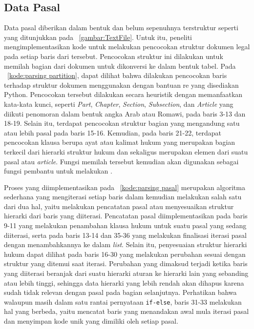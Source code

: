 \subsection{Data Pasal}
\label{subbab:4:Data Pasal}
Data pasal diberikan dalam bentuk \txt{} \file{} dan belum sepenuhnya terstruktur seperti yang ditunjukkan pada \gambar{}~\ref{gambar:TextFile}. Untuk itu, peneliti mengimplementasikan kode untuk melakukan pencocokan struktur dokumen legal pada setiap baris dari \file{} tersebut. Pencocokan struktur ini dilakukan untuk memilah bagian dari dokumen untuk dikonversi ke dalam bentuk tabel. Pada \kode{}~\ref{kode:parsing partition}, dapat dilihat bahwa dilakukan pencocokan baris terhadap struktur dokumen menggunakan \regex{} dengan bantuan \library{} re yang disediakan Python. Pencocokan tersebut dilakukan secara heuristik dengan memanfaatkan kata-kata kunci, seperti \textit{Part}, \textit{Chapter}, \textit{Section}, \textit{Subsection}, dan \textit{Article} yang diikuti penomoran dalam bentuk angka Arab atau Romawi, pada baris 3-13 dan 18-19. Selain itu, terdapat pencocokan struktur bagian yang mengandung satu atau lebih pasal pada baris 15-16. Kemudian, pada baris 21-22, terdapat pencocokan klausa berupa ayat atau kalimat hukum yang merupakan bagian terkecil dari hierarki struktur hukum dan sekaligus merupakan elemen dari suatu pasal atau \textit{article}. Fungsi memilah tersebut kemudian akan digunakan sebagai fungsi pembantu untuk melakukan \parsing{}.


Proses \parsing{} yang diimplementasikan pada \kode{}~\ref{kode:parsing pasal} merupakan algoritma sederhana yang mengiterasi setiap baris dalam \file{} kemudian melakukan salah satu dari dua hal, yaitu melakukan pencatatan pasal atau menyesuaikan struktur hierarki dari baris yang diiterasi. Pencatatan pasal diimplementasikan pada baris 9-11 yang melakukan penambahan klausa hukum untuk suatu pasal yang sedang diiterasi, serta pada baris 13-14 dan 35-36 yang melakukan finalisasi iterasi pasal dengan menambahkannya ke dalam \textit{list}. Selain itu, penyesuaian struktur hierarki hukum dapat dilihat pada baris 16-30 yang melakukan perubahan sesuai dengan struktur yang ditemui saat iterasi. Perubahan yang dimaksud terjadi ketika baris yang diiterasi beranjak dari suatu hierarki aturan ke hierarki lain yang sebanding atau lebih tinggi, sehingga data hierarki yang lebih rendah akan dihapus karena sudah tidak relevan dengan pasal pada bagian selanjutnya. Perhatikan bahwa walaupun masih dalam satu rantai pernyataan \lstinline{if-else}, baris 31-33 melakukan hal yang berbeda, yaitu mencatat baris yang menandakan awal mula iterasi pasal dan menyimpan kode unik yang dimiliki oleh setiap pasal.


